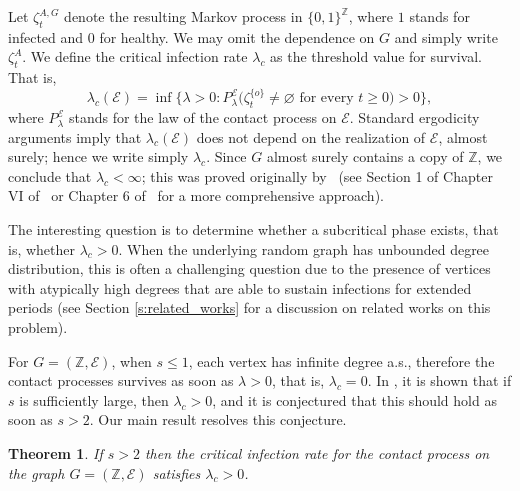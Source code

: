 \documentclass[a4paper,oneside,12pt]{amsart}
\renewcommand{\leq}{\leqslant}
\renewcommand{\geq}{\geqslant}
\theoremstyle{plain}
\newtheorem{theorem}{Theorem}
\theoremstyle{definition}
\theoremstyle{remark}
\begin{document}
Let \( \zeta^{A,G}_t \) denote the resulting Markov process in \( \{0,1\}^{\mathbb{Z}} \), where $1$ stands for infected and $0$ for healthy.
We may omit the dependence on \( G \) and simply write \( \zeta^A_t \).  
We define the critical infection rate $\lambda_c$ as the threshold value for survival.
That is,
\[
\lambda_c(\mathcal{E}) = \inf\big\{\lambda > 0 \colon {P}_{\lambda}^{\mathcal{E}}\big(\zeta^{\{o\}}_t \neq \varnothing \text{ for every } t \geq 0\big) > 0\big\},
\]
where $P^{\mathcal{E}}_{\lambda}$ stands for the law of the contact process on $\mathcal{E}$.
Standard ergodicity arguments imply that \( \lambda_c (\mathcal{E})\) does not depend on the realization of $\mathcal{E}$, almost surely; hence we write simply $\lambda_c$.
Since \( G \) almost surely contains a copy of \(\mathbb{Z}\), we conclude that \( \lambda_c < \infty \); this was proved originally by~\cite{Harris74} (see Section 1 of Chapter VI of~\cite{Liggett1985} or Chapter 6 of~\cite{Grimmett2010} for a more comprehensive approach).

The interesting question is to determine whether a subcritical phase exists, that is, whether $\lambda_c >0$.
When the underlying random graph has unbounded degree distribution, this is often a challenging question due to the presence of vertices with atypically high degrees that are able to sustain infections for extended periods (see Section \ref{s:related_works} for a discussion on related works on this problem).

For $G = (\mathbb{Z},\mathcal{E})$, when $s\leq 1$, each vertex has infinite degree a.s., therefore the contact processes survives as soon as $\lambda >0$, that is, $\lambda_c=0$.
In \cite{HaoCan_15}, it is shown that if \( s \) is sufficiently large, then \( \lambda_c > 0 \), and it is conjectured that this should hold as soon as \( s > 2 \).  
Our main result resolves this conjecture.

\begin{theorem}
\label{theo1}  
If $s>2$ then the critical infection rate for the contact process on the graph $G=(\mathbb{Z},\mathcal{E})$ satisfies  \( \lambda_c >0 \).
\end{theorem}
\end{document}
